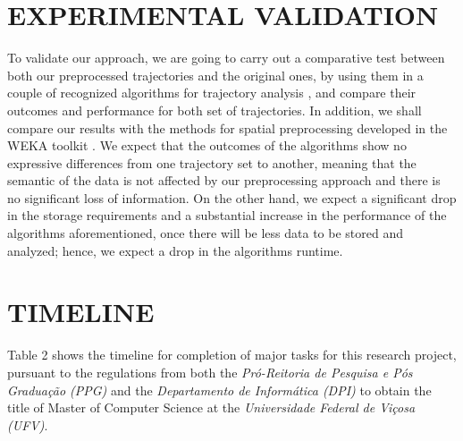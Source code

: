\documentclass[a4paper,12pt]{article}
\begin{document}
\section{EXPERIMENTAL VALIDATION}\label{sec:validation}
To validate our approach, we are going to carry out a comparative test between both our preprocessed trajectories and the original ones, by using them in a couple of recognized algorithms for trajectory analysis \cite{gudmundsson2012}\cite{zheng2008} \cite{zheng2009}, and compare their outcomes and performance for both set of trajectories. In addition, we shall compare our results with the methods for spatial preprocessing developed in the WEKA toolkit \cite{bogorny2006weka}. We expect that the outcomes of the algorithms show no expressive differences from one trajectory set to another, meaning that the semantic of the data is not affected by our preprocessing approach and there is no significant loss of information. On the other hand, we expect a significant drop in the storage requirements and a substantial increase in the performance of the algorithms aforementioned, once there will be less data to be stored and analyzed; hence, we expect a drop in the algorithms runtime.

\section{TIMELINE}\label{sec:timeline}

Table 2 shows the timeline for completion of major tasks for this research project, pursuant to the regulations from both the \textit{Pró-Reitoria de Pesquisa e Pós Graduação (PPG)} and the \textit{Departamento de Informática (DPI)}  to obtain the title of Master of Computer Science at the \textit{Universidade Federal de Viçosa (UFV)}.
\end{document}
